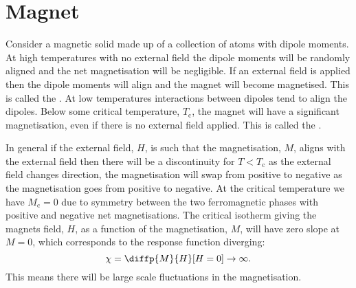 \documentclass[fleqn]{NotesClass}
\begin{document}
    \begin{figure}
    \end{figure}
    
    \section{Magnet}
    Consider a magnetic solid made up of a collection of atoms with dipole moments.
    At high temperatures with no external field the dipole moments will be randomly aligned and the net magnetisation will be negligible.
    If an external field is applied then the dipole moments will align and the magnet will become magnetised.
    This is called the .
    At low temperatures interactions between dipoles tend to align the dipoles.
    Below some critical temperature, \(T_{\mathrm{c}}\), the magnet will have a significant magnetisation, even if there is no external field applied.
    This is called the .
    
    In general if the external field, \(H\), is such that the magnetisation, \(M\), aligns with the external field then there will be a discontinuity for \(T < T_{\mathrm{c}}\) as the external field changes direction, the magnetisation will swap from positive to negative as the magnetisation goes from positive to negative.
    At the critical temperature we have \(M_{\mathrm{c}} = 0\) due to symmetry between the two ferromagnetic phases with positive and negative net magnetisations.
    The critical isotherm giving the magnets field, \(H\), as a function of the magnetisation, \(M\), will have zero slope at \(M = 0\), which corresponds to the response function diverging:
    \begin{equation}
        \chi = \diffp{M}{H}[H = 0] \to \infty.
    \end{equation}
    This means there will be large scale fluctuations in the magnetisation.
    
\end{document}
